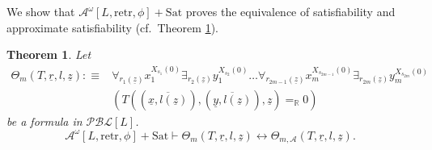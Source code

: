 \documentclass[11pt]{amsart}
\newtheorem{theorem}{Theorem}[section]
\theoremstyle{definition}
\theoremstyle{remark}
\def\RR{\mathbb{R}}
\begin{document}
We show that $\mathcal{A}^\omega[L,\mathrm{retr},\phi] + \mathrm{Sat}$ proves the equivalence of satisfiability and approximate satisfiability (cf.\ Theorem \ref{thrm:equiv:approxsat:sat}). 
\begin{theorem}
\label{thrm:equiv:approxsat:sat}
    Let
\begin{align*}
    \Theta_m(T,\underline{r},l,\underline{z}):\equiv &\forall_{r_1(\underline{z})} x_1^{X_{s_1}(0)} \exists_{r_2(\underline{z})} y_1^{X_{s_2}(0)} \ldots \forall_{r_{2m-1}(\underline{z})} x_m^{X_{s_{2m-1}}(0)}\exists_{r_{2m}(\underline{z})} y_m^{X_{s_{2m}}(0)}\\&(T((\overline{\underline{x},l(\underline{z})}),(\overline{\underline{y},l(\underline{z})}),\underline{z})=_\RR 0)
\end{align*}
be a formula in $\mathcal{PBL}[L]$.
\[
\mathcal{A}^\omega[L,\mathrm{retr},\phi] + \mathrm{Sat}\vdash \Theta_m(T,\underline{r},l,\underline{z}) \leftrightarrow \Theta_{m,\mathcal{A}}(T,\underline{r},l,\underline{z}).
\]
\end{theorem}
\end{document}
